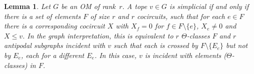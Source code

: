 \documentclass[final,11pt]{article}
\newtheorem{lem}[thm]{Lemma}%
\begin{document}
\begin{lem}\label{lem:simplicialvertex}
Let $G$ be an OM of rank~$r$. A tope $v\in G$ is simplicial if and only if there is a set of elements $F$ of size $r$ and $r$ cocircuits, such that for each $e \in F$ there is a corresponding cocircuit $X$ with $X_f=0$ for $f \in F\setminus\{e\}$, $X_e \neq 0$ and $X \leq v$. In the graph interpretation, this is equivalent to $r$ $\Theta$-classes $F$ and $r$ antipodal subgraphs incident with $v$ such that each is crossed by $F\setminus\{E_e\}$ but not by $E_e$, each for a different $E_e$. In this case, $v$ is incident with elements ($\Theta$-classes) in $F$.
%
\end{lem}
% 
% 
\end{document}
